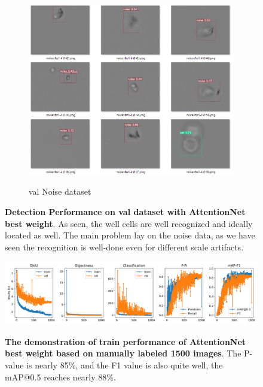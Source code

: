 \begin{figure}[t]
\begin{center}
\begin{subfigure}[c]{0.6\textwidth}
			\includegraphics[width=\textwidth]{thesis-template-master/images/An illustration test performance of CellYolo best weight2.png}
			\label{fig:Out of Focus}
			\caption{val Noise dataset}
		\end{subfigure}
		
	\end{center}
	\caption{ \textbf{Detection Performance on val dataset with AttentionNet best weight}. As seen, the well cells are well recognized and ideally located as well. The main problem lay on the noise data, as we have seen the recognition is well-done even for different scale artifacts.}
	\label{fig:4.7}
	
\end{figure}

\begin{figure}[h]
\begin{center}
\includegraphics[width=\textwidth]{thesis-template-master/images/cellyolo best weight based on manually labeled 1500 images.png}
\label{fig:cellnet}
\end{center}
\caption{\textbf{The demonstration of train performance of AttentionNet best weight based on manually labeled 1500 images}. The P-value is nearly 85\%, and the F1 value is also quite well, the mAP@0.5 reaches nearly 88\%.}
\end{figure}

